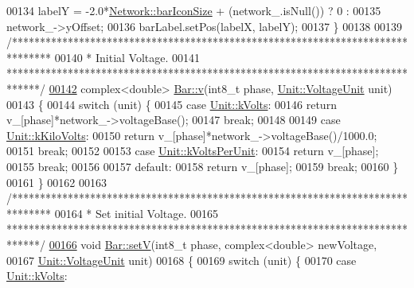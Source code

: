 \begin{DoxyCode}
00134   labelY = -2.0*\hyperlink{group___models_gaa334bbc93b3fde219840e95e23198b53}{Network::barIconSize} + (network\_.isNull()) ? 0 :
00135            network\_->yOffset;
00136   barLabel.setPos(labelX, labelY);
00137 \}
00138 
00139 \textcolor{comment}{/*******************************************************************************}
00140 \textcolor{comment}{ * Initial Voltage.}
00141 \textcolor{comment}{ ******************************************************************************/}
\hypertarget{bar_8cpp_source_l00142}{}\hyperlink{group___models_gab3ed62a7f2eb9c41a0b84543f1ef8d3b}{00142} complex<double> \hyperlink{group___models_gab3ed62a7f2eb9c41a0b84543f1ef8d3b}{Bar::v}(int8\_t phase, \hyperlink{class_unit_a55b07dfa9457e1eca2c7194fe0cfc3c1}{Unit::VoltageUnit} unit)
00143 \{
00144   \textcolor{keywordflow}{switch} (unit) \{
00145   \textcolor{keywordflow}{case} \hyperlink{class_unit_a55b07dfa9457e1eca2c7194fe0cfc3c1aa54b2473993a702a3923525765bd6e4c}{Unit::kVolts}:
00146     \textcolor{keywordflow}{return} v\_[phase]*network\_->voltageBase();
00147     \textcolor{keywordflow}{break};
00148 
00149   \textcolor{keywordflow}{case} \hyperlink{class_unit_a55b07dfa9457e1eca2c7194fe0cfc3c1a35a201a658c2cd89766787c657e9a54d}{Unit::kKiloVolts}:
00150     \textcolor{keywordflow}{return} v\_[phase]*network\_->voltageBase()/1000.0;
00151     \textcolor{keywordflow}{break};
00152 
00153   \textcolor{keywordflow}{case} \hyperlink{class_unit_a55b07dfa9457e1eca2c7194fe0cfc3c1ab44b1310b59fdcdc9df5bbea91da4206}{Unit::kVoltsPerUnit}:
00154     \textcolor{keywordflow}{return} v\_[phase];
00155     \textcolor{keywordflow}{break};
00156 
00157   \textcolor{keywordflow}{default}:
00158     \textcolor{keywordflow}{return} v\_[phase];
00159     \textcolor{keywordflow}{break};
00160   \}
00161 \}
00162 
00163 \textcolor{comment}{/*******************************************************************************}
00164 \textcolor{comment}{ * Set initial Voltage.}
00165 \textcolor{comment}{ ******************************************************************************/}
\hypertarget{bar_8cpp_source_l00166}{}\hyperlink{group___models_ga8d1e70b2d11ed4245e81b8b20858079d}{00166} \textcolor{keywordtype}{void} \hyperlink{group___models_ga8d1e70b2d11ed4245e81b8b20858079d}{Bar::setV}(int8\_t phase, complex<double> newVoltage,
00167                \hyperlink{class_unit_a55b07dfa9457e1eca2c7194fe0cfc3c1}{Unit::VoltageUnit} unit)
00168 \{
00169   \textcolor{keywordflow}{switch} (unit) \{
00170   \textcolor{keywordflow}{case} \hyperlink{class_unit_a55b07dfa9457e1eca2c7194fe0cfc3c1aa54b2473993a702a3923525765bd6e4c}{Unit::kVolts}:

\end{DoxyCode}
